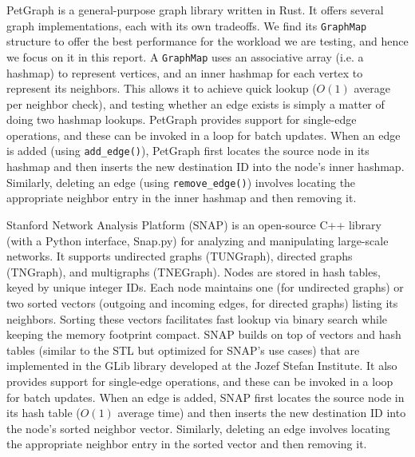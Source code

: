 PetGraph \cite{sverdrup2025petgraph} is a general-purpose graph library written in Rust. It offers several graph implementations, each with its own tradeoffs. We find its \texttt{GraphMap} structure to offer the best performance for the workload we are testing, and hence we focus on it in this report. A \texttt{GraphMap} uses an associative array (i.e. a hashmap) to represent vertices, and an inner hashmap for each vertex to represent its neighbors. This allows it to achieve quick lookup ($O(1)$ average per neighbor check), and testing whether an edge exists is simply a matter of doing two hashmap lookups. PetGraph provides support for single-edge operations, and these can be invoked in a loop for batch updates. When an edge is added (using \texttt{add\_edge()}), PetGraph first locates the source node in its hashmap and then inserts the new destination ID into the node's inner hashmap. Similarly, deleting an edge (using \texttt{remove\_edge()}) involves locating the appropriate neighbor entry in the inner hashmap and then removing it.

Stanford Network Analysis Platform (SNAP) \cite{leskovec2016snap} is an open-source C++ library (with a Python interface, Snap.py) for analyzing and manipulating large-scale networks. It supports undirected graphs (TUNGraph), directed graphs (TNGraph), and multigraphs (TNEGraph). Nodes are stored in hash tables, keyed by unique integer IDs. Each node maintains one (for undirected graphs) or two sorted vectors (outgoing and incoming edges, for directed graphs) listing its neighbors. Sorting these vectors facilitates fast lookup via binary search while keeping the memory footprint compact. SNAP builds on top of vectors and hash tables (similar to the STL but optimized for SNAP's use cases) that are implemented in the GLib library developed at the Jozef Stefan Institute. It also provides support for single-edge operations, and these can be invoked in a loop for batch updates. When an edge is added, SNAP first locates the source node in its hash table ($O(1)$ average time) and then inserts the new destination ID into the node's sorted neighbor vector. Similarly, deleting an edge involves locating the appropriate neighbor entry in the sorted vector and then removing it.

